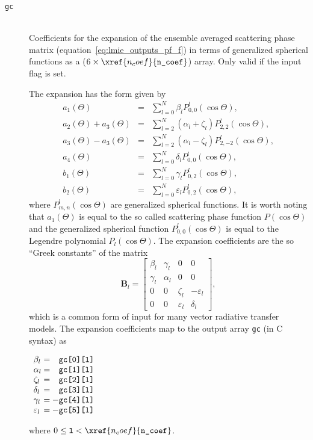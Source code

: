 \begin{description}
\item[\texttt{gc}] \hfill \\
Coefficients for the expansion of the ensemble averaged scattering phase matrix (equation~\ref{eq:lmie_outputs_pf_f}) in terms of generalized spherical functions as a ($6 \times \xref{n_coef}{\texttt{n\_coef}}$) array.  Only valid if the input flag  is set.

The expansion has the form given by
\begin{eqnarray*}
a_{1}(\Theta) &=& \sum^{N}_{l = 0} \beta_{l} P^{l}_{0,0}(\cos{\Theta}), \\
a_{2}(\Theta) + a_{3}(\Theta) &=& \sum^{N}_{l = 2} (\alpha_{l} + \zeta_{l}) P^{l}_{2,2}(\cos{\Theta}), \\
a_{3}(\Theta) - a_{3}(\Theta) &=& \sum^{N}_{l = 2} (\alpha_{l} - \zeta_{l}) P^{l}_{2,-2}(\cos{\Theta}), \\
a_{4}(\Theta) &=& \sum^{N}_{l = 0} \delta_{l} P^{l}_{0,0}(\cos{\Theta}), \\
b_{1}(\Theta) &=& \sum^{N}_{l = 0} \gamma_{l} P^{l}_{0,2}(\cos{\Theta}), \\
b_{2}(\Theta) &=& \sum^{N}_{l = 0} \varepsilon_{l} P^{l}_{0,2}(\cos{\Theta}),
\end{eqnarray*}
where $P^{l}_{m,n}(\cos{\Theta})$ are generalized spherical functions.  It is worth noting that $a_{1}(\Theta)$ is equal to the so called scattering phase function $P(\cos{\Theta})$ and the generalized spherical function $P^{l}_{0,0}(\cos{\Theta})$ is equal to the Legendre polynomial $P_{l}(\cos{\Theta})$.  The expansion coefficients are the so ``Greek constants'' \citep{siewert_c_e_1982a} of the matrix
\begin{equation}
\mathbf{B}_{l} =
\left[
\begin{array}{cccc}
\beta_{l} & \gamma_{l} & 0 & 0 \\
\gamma_{l} & \alpha_{l} & 0 & 0 \\
0 & 0 & \zeta_{l} & -\varepsilon_{l} \\
0 & 0 & \varepsilon_{l} & \delta_{l}
\end{array}
\right],
\label{eq:lmie_outputs_gc_b}
\end{equation}
which is a common form of input for many vector radiative transfer models.  The expansion coefficients map to the output array \texttt{gc} (in C syntax) as 
\begin{indentall}
\(
\begin{array}{l@{\hspace{.25em}}c@{\hspace{.25em}}r}
\beta_{l}       &=& \texttt{gc[0][l]} \\
\alpha_{l}      &=& \texttt{gc[1][l]} \\
\zeta_{l}       &=& \texttt{gc[2][l]} \\
\delta_{l}      &=& \texttt{gc[3][l]} \\
\gamma_{l}      &=& -\texttt{gc[4][l]} \\
\varepsilon_{l} &=& -\texttt{gc[5][l]}
\end{array}
\)
\end{indentall}
where $0 \le \texttt{l} < \xref{n_coef}{\texttt{n\_coef}}$.


\end{description}
